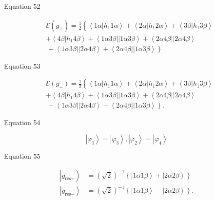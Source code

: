 \documentclass[aps]{revtex4}%
\begin{document}
Equation 52%

\begin{align*}
&  \mathcal{E}\left(  g_{+}\right)  =\frac{1}{2}\left\{  \overset
{}{\left\langle 1\alpha\left\vert h_{1}1\alpha\right.  \right\rangle
+\left\langle 2\alpha\left\vert h_{1}2\alpha\right.  \right\rangle
+\left\langle 3\beta\left\vert h_{1}3\beta\right.  \right\rangle }\right. \\
&  +\left\langle 4\beta\left\vert h_{1}4\beta\right.  \right\rangle
+\left\langle 1\alpha3\beta\right\vert \left\vert 1\alpha3\beta\right\rangle
+\left\langle 2\alpha4\beta\right\vert \left\vert 2\alpha4\beta\right\rangle
\\
&  \left.  \,+\left\langle 1\alpha3\beta\right\vert \left\vert 2\alpha
4\beta\right\rangle +\left\langle 2\alpha4\beta\right\vert \left\vert
1\alpha3\beta\right\rangle \overset{}{}\right\}
\end{align*}


Equation 53%

\begin{align*}
&  \mathcal{E}\left(  g_{-}\right)  =\frac{1}{2}\left\{  \overset
{}{\left\langle 1\alpha\left\vert h_{1}1\alpha\right.  \right\rangle
+\left\langle 2\alpha\left\vert h_{1}2\alpha\right.  \right\rangle
+\left\langle 3\beta\left\vert h_{1}3\beta\right.  \right\rangle }\right. \\
&  +\left\langle 4\beta\left\vert h_{1}4\beta\right.  \right\rangle
+\left\langle 1\alpha3\beta\right\vert \left\vert 1\alpha3\beta\right\rangle
+\left\langle 2\alpha4\beta\right\vert \left\vert 2\alpha4\beta\right\rangle
\\
&  \left.  \,-\left\langle 1\alpha3\beta\right\vert \left\vert 2\alpha
4\beta\right\rangle -\left\langle 2\alpha4\beta\right\vert \left\vert
1\alpha3\beta\right\rangle \overset{}{}\right\}  .
\end{align*}


Equation 54%

\begin{equation}
\left\vert \varphi_{1}\right\rangle =\left\vert \varphi_{3}\right\rangle
,\left\vert \varphi_{2}\right\rangle =\left\vert \varphi_{4}\right\rangle
\nonumber
\end{equation}


Equation 55%

\begin{align*}
\left\vert g_{\text{res}+}\right\rangle  &  =\left(  \sqrt{2}\right)
^{-1}\left\{  \left\vert 1\alpha1\beta\right\rangle +\left\vert 2\alpha
2\beta\right\rangle \right\} \\
\left\vert g_{\text{res}-}\right\rangle  &  =\left(  \sqrt{2}\right)
^{-1}\left\{  \left\vert 1\alpha1\beta\right\rangle -\left\vert 2\alpha
2\beta\right\rangle \right\}  .
\end{align*}
\end{document}
